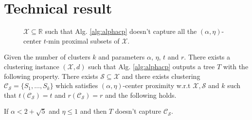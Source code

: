 \documentclass[anon,12pt]{colt2016} %
\newcommand{\mc}{\mathcal}
\begin{document}

 


\appendix
\section{Technical result}
\label{appendix:sectiontr}
\begin{figure}

\caption{$\mc X \subseteq \mathbb{R}$ such that Alg. \ref{alg:alphacp} doesn't capture all the $(\alpha, \eta)$-center $t$-min proximal subsets of $\mc X$.}
\label{fig:algAlphacp}
\end{figure}

\begin{theorem}
\label{thm:algAlphacp}
Given the number of clusters $k$ and parameters $\alpha$, $\eta$, $t$ and $r$. There exists a clustering instance $(\mc X, d)$ such that Alg. \ref{alg:alphacp} outputs a tree $T$ with the following property. There exists $\mc S \subseteq \mc X$ and there exists clustering $\mc C_{\mc S} = \{S_1, \ldots, S_k\}$ which satisfies $(\alpha, \eta)$-center proximity w.r.t $\mc X, \mc S$ and $k$ such that $ t(\mc C_{\mc S}) = t$ and $r(\mc C_{\mc S}) = r$ and the following holds. 

If $\alpha < 2 + \sqrt 5$ and $\eta \le 1$ and then $T$ doesn't capture $\mc C_{\mc S}$.
\end{theorem}
\end{document}
